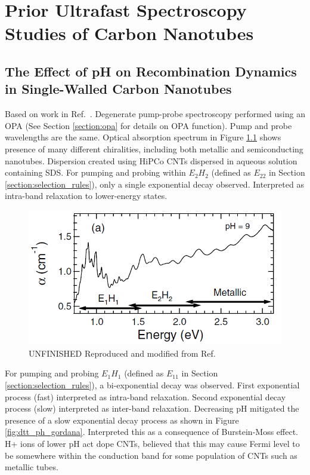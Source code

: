 \chapter{Prior Ultrafast Spectroscopy Studies of Carbon Nanotubes}

\section{The Effect of pH on Recombination Dynamics in Single-Walled Carbon Nanotubes}

Based on work in Ref.\ \cite{ostojic2004interband}. Degenerate pump-probe spectroscopy performed using an OPA (See Section \ref{section:opa} for details on OPA function). Pump and probe wavelengths are the same. Optical absorption spectrum in Figure \ref{fig:abs_gordana} shows presence of many different chiralities, including both metallic and semiconducting nanotubes. Dispersion created using HiPCo CNTs dispersed in aqueous solution containing SDS. For pumping and probing within $E_2 H_2$ (defined as $E_{22}$ in Section \ref{section:selection_rules}), only a single exponential decay observed. Interpreted as intra-band relaxation to lower-energy states.
\begin{figure}[ht]
	\centering
	\includegraphics[scale=0.7]{images/chapter_prior_works/abs_gordana}
	\caption{{\color{red} UNFINISHED } Reproduced and modified from Ref.\ \cite{ostojic2004interband}}
	\label{fig:abs_gordana}
\end{figure}

For pumping and probing $E_1 H_1$ (defined as $E_{11}$ in Section \ref{section:selection_rules}), a bi-exponential decay was observed. First exponential process (fast) interpreted as intra-band relaxation. Second exponential decay process (slow) interpreted as inter-band relaxation. Decreasing pH mitigated the presence of a slow exponential decay process as shown in Figure \ref{fig:dtt_ph_gordana}. Interpreted this as a consequence of Burstein-Moss effect. H+ ions of lower pH act dope CNTs, believed that this may cause Fermi level to be somewhere within the conduction band for some population of CNTs such as metallic tubes.


